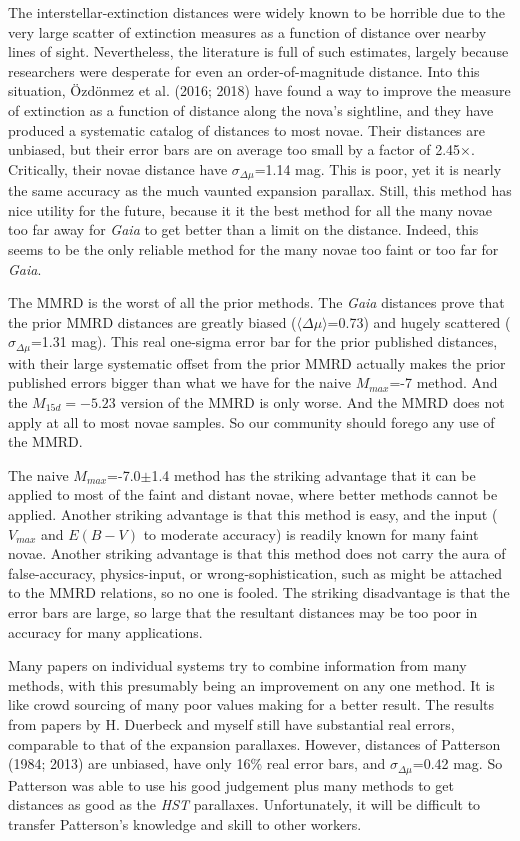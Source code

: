 \documentclass[a4paper,fleqn,usenatbib]{mnras}
\begin{document}
The interstellar-extinction distances were widely known to be horrible due to the very large scatter of extinction measures as a function of distance over nearby lines of sight.  Nevertheless, the literature is full of such estimates, largely because researchers were desperate for even an order-of-magnitude distance.  Into this situation, \"{O}zd\"{o}nmez et al. (2016; 2018) have found a way to improve the measure of extinction as a function of distance along the nova's sightline, and they have produced a systematic catalog of distances to most novae.  Their distances are unbiased, but their error bars are on average too small by a factor of 2.45$\times$.  Critically, their novae distance have $\sigma_{\Delta \mu}$=1.14 mag.  This is poor, yet it is nearly the same accuracy as the much vaunted expansion parallax.  Still, this method has nice utility for the future, because it it the best method for all the many novae too far away for {\it Gaia} to get better than a limit on the distance.  Indeed, this seems to be the only reliable method for the many novae too faint or too far for {\it Gaia}.

The MMRD is the worst of all the prior methods.  The {\it Gaia} distances prove that the prior MMRD distances are greatly biased ($\langle \Delta \mu \rangle$=0.73) and hugely scattered ($\sigma_{\Delta \mu}$=1.31 mag).  This real one-sigma error bar for the prior published distances, with their large systematic offset from the prior MMRD actually makes the prior published errors bigger than what we have for the naive $M_{max}$=-7 method.  And the $M_{15d}=-5.23$ version of the MMRD is only worse.  And the MMRD does not apply at all to most novae samples.  So our community should forego any use of the MMRD.

The naive $M_{max}$=-7.0$\pm$1.4 method has the striking advantage that it can be applied to most of the faint and distant novae, where better methods cannot be applied.  Another striking advantage is that this method is easy, and the input ($V_{max}$ and $E(B-V)$ to moderate accuracy) is readily known for many faint novae.  Another striking advantage is that this method does not carry the aura of false-accuracy, physics-input, or wrong-sophistication, such as might be attached to the MMRD relations, so no one is fooled.  The striking disadvantage is that the error bars are large, so large that the resultant distances may be too poor in accuracy for many applications.

Many papers on individual systems try to combine information from many methods, with this presumably being an improvement on any one method.  It is like crowd sourcing of many poor values making for a better result.  The results from papers by H. Duerbeck and myself still have substantial real errors, comparable to that of the expansion parallaxes.  However, distances of Patterson (1984; 2013) are unbiased, have only 16\% real error bars, and $\sigma_{\Delta \mu}$=0.42 mag.  So Patterson was able to use his good judgement plus many methods to get distances as good as the {\it HST} parallaxes.  Unfortunately, it will be difficult to transfer Patterson's knowledge and skill to other workers.
\end{document}
